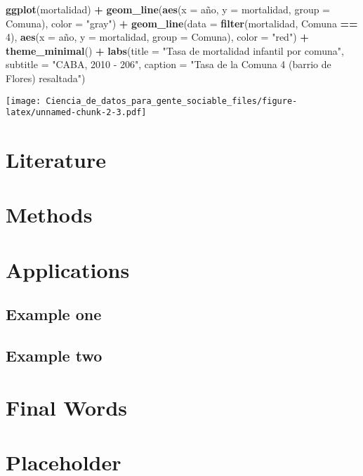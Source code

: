 \documentclass[]{book}
\newenvironment{Shaded}{\begin{snugshade}}{\end{snugshade}}
\newcommand{\KeywordTok}[1]{\textcolor[rgb]{0.13,0.29,0.53}{\textbf{#1}}}
\newcommand{\DataTypeTok}[1]{\textcolor[rgb]{0.13,0.29,0.53}{#1}}
\newcommand{\DecValTok}[1]{\textcolor[rgb]{0.00,0.00,0.81}{#1}}
\newcommand{\StringTok}[1]{\textcolor[rgb]{0.31,0.60,0.02}{#1}}
\newcommand{\OperatorTok}[1]{\textcolor[rgb]{0.81,0.36,0.00}{\textbf{#1}}}
\newcommand{\NormalTok}[1]{#1}
\theoremstyle{definition}
\theoremstyle{definition}
\theoremstyle{definition}
\theoremstyle{remark}
\begin{document}
\begin{Shaded}
\begin{Highlighting}[]
\KeywordTok{ggplot}\NormalTok{(mortalidad) }\OperatorTok{+}\StringTok{ }
\StringTok{    }\KeywordTok{geom_line}\NormalTok{(}\KeywordTok{aes}\NormalTok{(}\DataTypeTok{x =}\NormalTok{ año, }\DataTypeTok{y =}\NormalTok{ mortalidad, }\DataTypeTok{group =}\NormalTok{ Comuna), }\DataTypeTok{color =} \StringTok{"gray"}\NormalTok{) }\OperatorTok{+}
\StringTok{    }\KeywordTok{geom_line}\NormalTok{(}\DataTypeTok{data =} \KeywordTok{filter}\NormalTok{(mortalidad, Comuna }\OperatorTok{==}\StringTok{ }\DecValTok{4}\NormalTok{), }
              \KeywordTok{aes}\NormalTok{(}\DataTypeTok{x =}\NormalTok{ año, }\DataTypeTok{y =}\NormalTok{ mortalidad, }\DataTypeTok{group =}\NormalTok{ Comuna), }\DataTypeTok{color =} \StringTok{"red"}\NormalTok{) }\OperatorTok{+}
\StringTok{    }\KeywordTok{theme_minimal}\NormalTok{() }\OperatorTok{+}
\StringTok{    }\KeywordTok{labs}\NormalTok{(}\DataTypeTok{title =} \StringTok{"Tasa de mortalidad infantil por comuna"}\NormalTok{, }
         \DataTypeTok{subtitle =} \StringTok{"CABA, 2010 - 206"}\NormalTok{,}
         \DataTypeTok{caption =} \StringTok{"Tasa de la Comuna 4 (barrio de Flores) resaltada"}\NormalTok{)}
\end{Highlighting}
\end{Shaded}

\texttt{[image: Ciencia\_de\_datos\_para\_gente\_sociable\_files/figure-latex/unnamed-chunk-2-3.pdf]}

\chapter{Literature}\label{literature}

\chapter{Methods}\label{methods}

\chapter{Applications}\label{applications}

\section{Example one}\label{example-one}

\section{Example two}\label{example-two}

\chapter{Final Words}\label{final-words}

\chapter{Placeholder}\label{placeholder}


\end{document}
